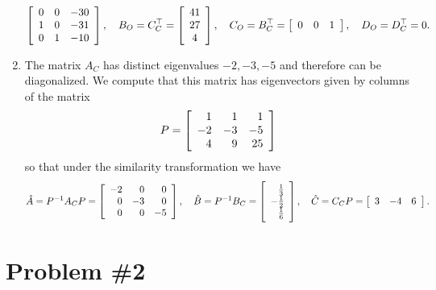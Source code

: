 \documentclass{article}
\begin{document}
\begin{enumerate}
{$$    \left[\begin{array}{r r r}
      0 & 0 & -30 \\
      1 & 0 & -31 \\
      0 & 1 & -10
    \end{array}\right], \quad
    B_O = C_C^\top =
    \left[\begin{array}{c}
      41 \\
      27 \\
      4
    \end{array}\right], \quad
    C_O = B_C^\top =
    \left[\begin{array}{c c c}
      0 & 0 & 1
    \end{array}\right], \quad
    D_O = D_C^\top = 0.
    $$
  }
  \item{
    The matrix $A_C$ has distinct eigenvalues $-2, -3, -5$ and
    therefore can be diagonalized. We compute that this matrix has
    eigenvectors given by columns of the matrix
    $$
    P = \left[\begin{array}{r r r}
      1 &  1 &  1 \\
     -2 & -3 & -5 \\
      4 &  9 & 25
    \end{array}\right]
    $$
    so that under the similarity transformation we have
    $$
    \hat{A} = P^{-1} A_C P =
    \left[\begin{array}{r r r}
      -2 &  0 &  0 \\
       0 & -3 &  0 \\
       0 &  0 & -5
    \end{array}\right], \quad
    \hat{B} = P^{-1} B_C =
    \left[\begin{array}{r}
       \frac{1}{3} \\
      -\frac{1}{2} \\
       \frac{1}{6}
    \end{array}\right], \quad
    \hat{C} = C_C P =
    \left[\begin{array}{r r r}
      3 & -4 & 6
    \end{array}\right].
    $$
  }
\end{enumerate}

\pagebreak

\section*{Problem \#2}
\end{document}
